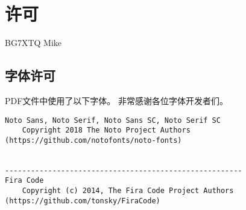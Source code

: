 \chapter*{许可}

\noindent {} BG7XTQ Mike

\section*{字体许可}

\noindent PDF文件中使用了以下字体。
非常感谢各位字体开发者们。

\begin{lstlisting}[numbers=none]
Noto Sans, Noto Serif, Noto Sans SC, Noto Serif SC
    Copyright 2018 The Noto Project Authors (https://github.com/notofonts/noto-fonts)


-------------------------------------------------------
Fira Code
    Copyright (c) 2014, The Fira Code Project Authors (https://github.com/tonsky/FiraCode)
\end{lstlisting}
